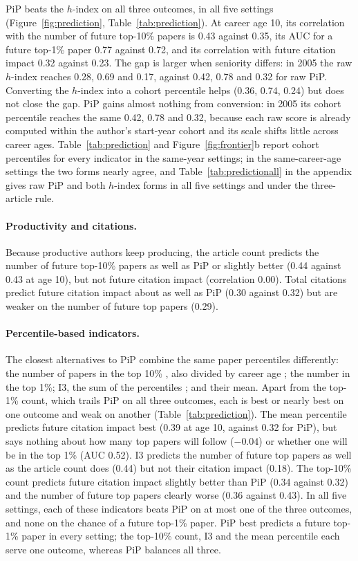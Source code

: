 \documentclass[11pt]{article}
\begin{document}
PiP beats the $h$-index on all three outcomes, in all five settings (Figure~\ref{fig:prediction},
Table~\ref{tab:prediction}). At career age 10, its correlation with the number of future top-10\% papers is 0.43 against
0.35, its AUC for a future top-1\% paper 0.77 against 0.72, and its correlation with future citation impact 0.32
against 0.23. The gap is larger when seniority differs: in 2005 the raw $h$-index reaches 0.28, 0.69 and 0.17, against
0.42, 0.78 and 0.32 for raw PiP. Converting the $h$-index into a cohort percentile helps (0.36, 0.74, 0.24) but does
not close the gap. PiP gains almost nothing from conversion: in 2005 its cohort percentile reaches the same 0.42, 0.78
and 0.32, because each raw score is already computed within the author's start-year cohort and its scale shifts little
across career ages. Table~\ref{tab:prediction} and Figure~\ref{fig:frontier}b report cohort percentiles for every indicator in
the same-year settings; in the same-career-age settings the two forms nearly agree, and Table~\ref{tab:predictionall}
in the appendix gives raw PiP and both $h$-index forms in all five settings and under the three-article rule.

\paragraph{Productivity and citations.} Because productive authors keep producing, the article count predicts the
number of future top-10\% papers as well as PiP or slightly better (0.44 against 0.43 at age 10), but not future
citation impact (correlation 0.00). Total citations predict future citation impact about as well as PiP (0.30 against
0.32) but are weaker on the number of future top papers (0.29).

\paragraph{Percentile-based indicators.} The closest alternatives to PiP combine the same paper percentiles differently:
the number of papers in the top 10\% \citep{waltman2012leiden}, also divided by career age
\citep{bornmann2014individual}; the number in the top 1\%; I3, the sum of the percentiles
\citep{leydesdorff2011integrated}; and their mean. Apart from the top-1\% count, which trails PiP on all three outcomes,
each is best or nearly best on one outcome and weak on another (Table~\ref{tab:prediction}). The mean percentile
predicts future citation impact best (0.39 at age 10, against 0.32 for PiP), but says nothing about how many top papers
will follow ($-0.04$) or whether one will be in the top 1\% (AUC 0.52). I3 predicts the number of future top papers as
well as the article count does (0.44) but not their citation impact (0.18). The top-10\% count predicts future citation
impact slightly better than PiP (0.34 against 0.32) and the number of future top papers clearly worse (0.36 against
0.43). In all five settings, each of these indicators beats PiP on at most one of the three outcomes, and none on the
chance of a future top-1\% paper. PiP best predicts a future top-1\% paper in every setting; the top-10\% count, I3
and the mean percentile each serve one outcome, whereas PiP balances all three.
\end{document}
